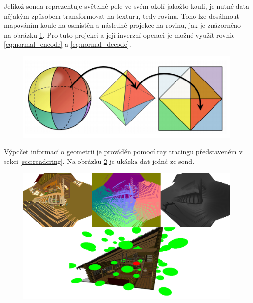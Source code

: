 Jelikož sonda reprezentuje světelné pole ve svém okolí jakožto kouli, je nutné data nějakým způsobem transformovat na texturu, tedy rovinu. Toho lze dosáhnout mapováním koule na osmistěn a následné projekce na rovinu, jak je znázorněno na obrázku \ref{fig:octahedral_wrap}. Pro tuto projekci a její inverzní operaci je možné využít rovnic \ref{eq:normal_encode} a \ref{eq:normal_decode}.

\begin{figure}[H]
	\centering
	\includegraphics[scale=2]{images/octahedral_wrap.png}
	\captionsetup{justification=centering}
	\label{fig:octahedral_wrap}
\end{figure}

Výpočet informací o geometrii je prováděn pomocí ray tracingu představeném v sekci \ref{sec:rendering}. Na obrázku \ref{fig:probe_in_scene} je ukázka dat jedné ze sond.


\begin{figure}[H]
	\centering
	\includegraphics[scale=1]{images/probe_with_scene.png}
	\captionsetup{justification=centering}
	\label{fig:probe_in_scene}
\end{figure}

